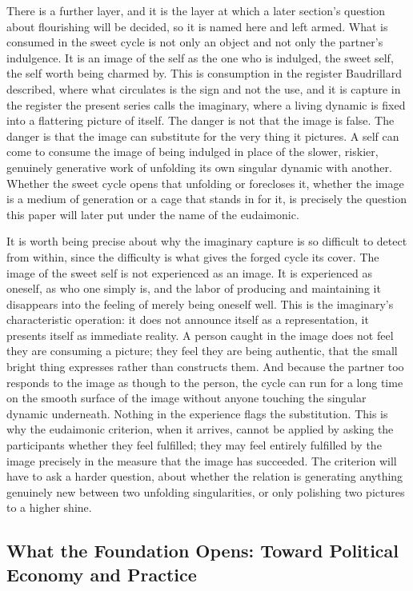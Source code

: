 \documentclass[11pt,a4paper]{article}
\begin{document}
There is a further layer, and it is the layer at which a later section's question about flourishing will be decided, so it is named here and left armed. What is consumed in the sweet cycle is not only an object and not only the partner's indulgence. It is an image of the self as the one who is indulged, the sweet self, the self worth being charmed by. This is consumption in the register Baudrillard described, where what circulates is the sign and not the use, and it is capture in the register the present series calls the imaginary, where a living dynamic is fixed into a flattering picture of itself. The danger is not that the image is false. The danger is that the image can substitute for the very thing it pictures. A self can come to consume the image of being indulged in place of the slower, riskier, genuinely generative work of unfolding its own singular dynamic with another. Whether the sweet cycle opens that unfolding or forecloses it, whether the image is a medium of generation or a cage that stands in for it, is precisely the question this paper will later put under the name of the eudaimonic.

It is worth being precise about why the imaginary capture is so difficult to detect from within, since the difficulty is what gives the forged cycle its cover. The image of the sweet self is not experienced as an image. It is experienced as oneself, as who one simply is, and the labor of producing and maintaining it disappears into the feeling of merely being oneself well. This is the imaginary's characteristic operation: it does not announce itself as a representation, it presents itself as immediate reality. A person caught in the image does not feel they are consuming a picture; they feel they are being authentic, that the small bright thing expresses rather than constructs them. And because the partner too responds to the image as though to the person, the cycle can run for a long time on the smooth surface of the image without anyone touching the singular dynamic underneath. Nothing in the experience flags the substitution. This is why the eudaimonic criterion, when it arrives, cannot be applied by asking the participants whether they feel fulfilled; they may feel entirely fulfilled by the image precisely in the measure that the image has succeeded. The criterion will have to ask a harder question, about whether the relation is generating anything genuinely new between two unfolding singularities, or only polishing two pictures to a higher shine.

\subsection{What the Foundation Opens: Toward Political Economy and Practice}
\end{document}

